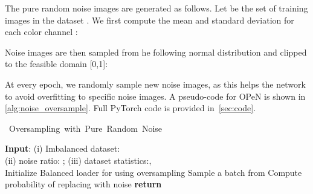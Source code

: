 \documentclass[nohyperref]{article}
\theoremstyle{plain}
\theoremstyle{definition}
\theoremstyle{remark}
\begin{document}
The pure random noise images are generated as follows.
Let  be the set of training images in the dataset . We first compute the mean and standard deviation for each color channel :
\vspace*{-0.1cm}

Noise images are then sampled 
from he following normal distribution and clipped to the feasible domain [0,1]:
\vspace*{-0.2cm}

\vspace*{-0.4cm}

At every epoch, we randomly sample new noise images, as this helps the network to avoid overfitting to specific noise images. 
A pseudo-code for OPeN is shown in \cref{alg:noise_oversample}. Full PyTorch code is provided in~\cref{sec:code}.
\vspace*{-0.2cm}
\begin{algorithm}
	\caption{\mbox{ \hspace{-0.2em}Oversampling with Pure Random Noise \hspace{-0.1em}{\small (OPeN)}}}
	\begin{algorithmic}
		\STATE \textbf{Input}: (i) Imbalanced dataset: \\ (ii) noise ratio: ; (iii) dataset statistics:, 
		\\\hrulefill
		\STATE Initialize 
		\STATE  Balanced loader for  using oversampling
		\STATE  Sample a batch from 
		\FORALL {}
		\STATE  Compute probability  of replacing  with noise
		\STATE 
		\STATE 
		\IF{}
		\STATE 
		\STATE 
		\ENDIF
		\ENDFOR
		\STATE \textbf{return} 
	\end{algorithmic}
	\label{alg:noise_oversample}
\end{algorithm}

\vspace*{-0.5cm}
\end{document}
